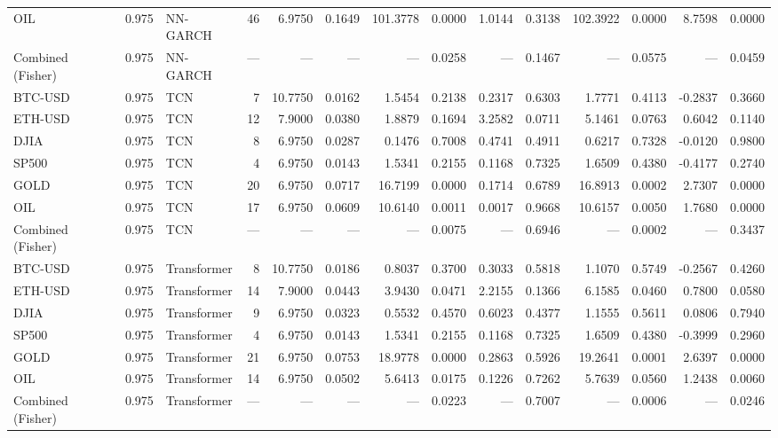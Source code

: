\begin{table}[ht]
\begin{tabular}{lllrrrrrrrrrrr}
OIL & 0.975 & NN-GARCH & 46 & 6.9750 & 0.1649 & 101.3778 & 0.0000 & 1.0144 & 0.3138 & 102.3922 & 0.0000 & 8.7598 & 0.0000 \\
Combined (Fisher) & 0.975 & NN-GARCH & — & — & — & — & 0.0258 & — & 0.1467 & — & 0.0575 & — & 0.0459 \\
BTC-USD & 0.975 & TCN & 7 & 10.7750 & 0.0162 & 1.5454 & 0.2138 & 0.2317 & 0.6303 & 1.7771 & 0.4113 & -0.2837 & 0.3660 \\
ETH-USD & 0.975 & TCN & 12 & 7.9000 & 0.0380 & 1.8879 & 0.1694 & 3.2582 & 0.0711 & 5.1461 & 0.0763 & 0.6042 & 0.1140 \\
DJIA & 0.975 & TCN & 8 & 6.9750 & 0.0287 & 0.1476 & 0.7008 & 0.4741 & 0.4911 & 0.6217 & 0.7328 & -0.0120 & 0.9800 \\
SP500 & 0.975 & TCN & 4 & 6.9750 & 0.0143 & 1.5341 & 0.2155 & 0.1168 & 0.7325 & 1.6509 & 0.4380 & -0.4177 & 0.2740 \\
GOLD & 0.975 & TCN & 20 & 6.9750 & 0.0717 & 16.7199 & 0.0000 & 0.1714 & 0.6789 & 16.8913 & 0.0002 & 2.7307 & 0.0000 \\
OIL & 0.975 & TCN & 17 & 6.9750 & 0.0609 & 10.6140 & 0.0011 & 0.0017 & 0.9668 & 10.6157 & 0.0050 & 1.7680 & 0.0000 \\
Combined (Fisher) & 0.975 & TCN & — & — & — & — & 0.0075 & — & 0.6946 & — & 0.0002 & — & 0.3437 \\
BTC-USD & 0.975 & Transformer & 8 & 10.7750 & 0.0186 & 0.8037 & 0.3700 & 0.3033 & 0.5818 & 1.1070 & 0.5749 & -0.2567 & 0.4260 \\
ETH-USD & 0.975 & Transformer & 14 & 7.9000 & 0.0443 & 3.9430 & 0.0471 & 2.2155 & 0.1366 & 6.1585 & 0.0460 & 0.7800 & 0.0580 \\
DJIA & 0.975 & Transformer & 9 & 6.9750 & 0.0323 & 0.5532 & 0.4570 & 0.6023 & 0.4377 & 1.1555 & 0.5611 & 0.0806 & 0.7940 \\
SP500 & 0.975 & Transformer & 4 & 6.9750 & 0.0143 & 1.5341 & 0.2155 & 0.1168 & 0.7325 & 1.6509 & 0.4380 & -0.3999 & 0.2960 \\
GOLD & 0.975 & Transformer & 21 & 6.9750 & 0.0753 & 18.9778 & 0.0000 & 0.2863 & 0.5926 & 19.2641 & 0.0001 & 2.6397 & 0.0000 \\
OIL & 0.975 & Transformer & 14 & 6.9750 & 0.0502 & 5.6413 & 0.0175 & 0.1226 & 0.7262 & 5.7639 & 0.0560 & 1.2438 & 0.0060 \\
Combined (Fisher) & 0.975 & Transformer & — & — & — & — & 0.0223 & — & 0.7007 & — & 0.0006 & — & 0.0246 \\
\bottomrule
\end{tabular}

\end{table}
